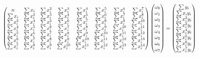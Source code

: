 \documentclass[12pt]{article}%
\begin{document}
\begin{enumerate}
\begin{enumerate}
		\[
		\scalemath{0.75}{
		\begin{pmatrix} n & \sum x_i & \sum x_i^2 & \sum x_i^3 & \sum x_i^4 & \sum x_i^5 & \sum x_i^6 & \sum x_i^7\\ \sum x_i & \sum x_i^2 & \sum x_i^3 & \sum x_i^4 & \sum x_i^5 & \sum x_i^6 & \sum x_i^7 & \sum x_i^8\\ \sum x_i^3 & \sum x_i^4 & \sum x_i^5 & \sum x_i^6 & \sum x_i^7 & \sum x_i^8 & \sum x_i^9 & \sum x_i^{10} \\ \sum x_i^4 & \sum x_i^5 & \sum x_i^6 & \sum x_i^7 & \sum x_i^8 & \sum x_i^9 & \sum x_i^{10} & \sum x_i^{11} \\ \sum x_i^5 & \sum x_i^6 & \sum x_i^7 & \sum x_i^8 & \sum x_i^9 & \sum x_i^{10} & \sum x_i^{11} & \sum x_i^{12} \\ \sum x_i^6 & \sum x_i^7 & \sum x_i^8 & \sum x_i^9 & \sum x_i^{10} & \sum x_i^{11} & \sum x_i^{12} & \sum x_i^{13} \\ \sum x_i^7 & \sum x_i^8 & \sum x_i^9 & \sum x_i^{10} & \sum x_i^{11} & \sum x_i^{12} & \sum x_i^{13} & \sum x_i^{14} \end{pmatrix} \begin{pmatrix} \omega_0\\ \omega_1\\ \omega_2\\ \omega_3\\ \omega_4\\ \omega_5\\ \omega_6 \\ \omega_7 \end{pmatrix} = \begin{pmatrix} \sum y_i\\ \sum x_i y_i\\ \sum x_i^2 y_i\\ \sum x_i^3 y_i\\ \sum x_i^4 y_i\\ \sum x_i^5 y_i\\ \sum x_i^6 y_i\\ \sum x_i^7 y_i \end{pmatrix} }
		\]


\end{enumerate}
\end{enumerate}
\end{document}
